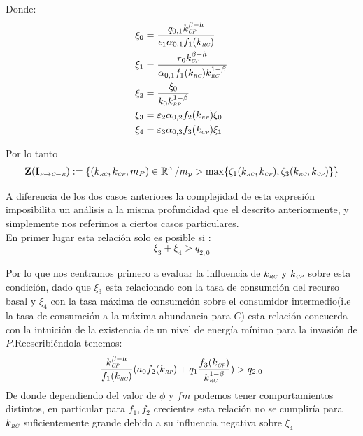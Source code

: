 Donde:
\begin{equation}
  \begin{aligned}
    \xi_0 &= \frac{q_{0,1} k_{\textit{\tiny CP}}^{\beta - h}}{\epsilon_1 \alpha_{0,1} f_1(k_{\textit{\tiny RC}})}\\
    \xi_1 &= \frac{r_0 k_{\textit{\tiny CP}}^{\beta-h}}{\alpha_{0,1} f_1(k_{\textit{\tiny RC}})k_{\textit{\tiny RC}}^{1-\beta}}\\
    \xi_2 &= \frac{\xi_0}{k_0 k_{\textit{\tiny RP}}^{1-\beta}} \\
    \xi_3 &= \varepsilon_2 \alpha_{0,2} f_2(k_{\textit{\tiny RP}}) \xi_0\\
    \xi_4 &=\varepsilon_3 \alpha_{0,3} f_3(k_{\textit{\tiny CP}}) \xi_1
  \end{aligned}
\end{equation}

Por lo tanto 
\begin{equation}
\mathbf{Z(I_{\textit{\tiny P} \to \textit{\tiny C}-\textit{\tiny R}})} := \{ (k_{\textit{\tiny RC}},k_{\textit{\tiny CP}},m_P) \in \mathbb{R}^3_+ / m_p > \max\{\zeta_1(k_{\textit{\tiny RC}},k_{\textit{\tiny CP}}),\zeta_3(k_{\textit{\tiny RC}},k_{\textit{\tiny CP}})\} \}
\end{equation}

A diferencia de los dos casos anteriores la complejidad de esta expresi\'on imposibilita un an\'alisis a la misma profundidad que el descrito anteriormente, y simplemente nos referimos a ciertos casos particulares.\\
En primer lugar esta relaci\'on solo es posible si :
\begin{equation}
  \xi_3 + \xi_4 > q_{2,0}
\end{equation}

Por lo que nos centramos primero a evaluar la influencia de $k_{\textit{\tiny RC}}$ y $k_{\textit{\tiny CP}}$ sobre esta condici\'on, dado que $\xi_3$ esta relacionado con la tasa de consumci\'on del recurso basal y $\xi_4$ con la tasa m\'axima de consumci\'on sobre el consumidor intermedio(i.e la tasa de consumci\'on a la m\'axima abundancia para $C$) esta relaci\'on concuerda con la intuici\'on de la existencia de un nivel de energ\'ia m\'inimo para la invasi\'on de $P$.Reescribi\'endola tenemos:
\begin{equation}
  \frac{k_{\textit{\tiny CP}}^{\beta - h}}{f_1(k_{\textit{\tiny RC}})}(a_0 f_2(k_{\textit{\tiny RP}}) + q_1 \frac{f_3(k_{\textit{\tiny CP}})}{k_{\textit{\tiny RC}}^{1-\beta}}) > q_{2,0}
\end{equation}
De donde dependiendo del valor de $\phi$ y $fm$ podemos tener comportamientos distintos, en particular para $f_1, f_2$ crecientes esta relaci\'on no se cumplir\'ia para $k_{\textit{\tiny RC}}$ suficientemente grande debido a su influencia negativa sobre $\xi_4$ 







